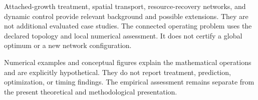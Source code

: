 Attached-growth treatment, spatial transport, resource-recovery networks, and dynamic control provide relevant background and possible extensions. They are not additional evaluated case studies. The connected operating problem uses the declared topology and local numerical assessment. It does not certify a global optimum or a new network configuration.

Numerical examples and conceptual figures explain the mathematical operations and are explicitly hypothetical. They do not report treatment, prediction, optimization, or timing findings. The empirical assessment remains separate from the present theoretical and methodological presentation.
